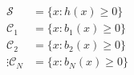 \documentclass[preview]{standalone}
\begin{document}
\begin{align*}
\mathcal{S} &= \{ x : h(x) \geq 0 \}\\ \mathcal{C}_1 &= \{ x : b_1(x) \geq 0 \}\\ \mathcal{C}_2 &= \{ x : b_2(x) \geq 0 \}\\ \vdots \mathcal{C}_N &= \{ x : b_N(x) \geq 0 \}
\end{align*}
\end{document}
